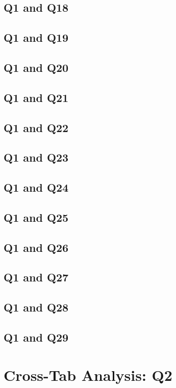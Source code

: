 \documentclass{report}
\begin{document}
\section{Q1 and Q18}\clearpage
\section{Q1 and Q19}\clearpage
\section{Q1 and Q20}\clearpage
\section{Q1 and Q21}\clearpage
\section{Q1 and Q22}\clearpage
\section{Q1 and Q23}\clearpage
\section{Q1 and Q24}\clearpage
\section{Q1 and Q25}\clearpage
\section{Q1 and Q26}\clearpage
\section{Q1 and Q27}\clearpage
\section{Q1 and Q28}\clearpage
\section{Q1 and Q29}\clearpage

\chapter{Cross-Tab Analysis: Q2}
\end{document}

